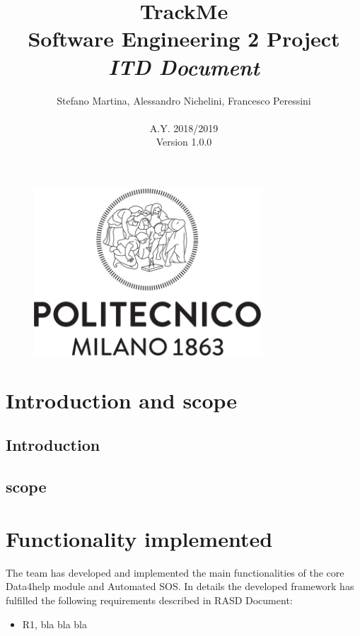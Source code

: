 \documentclass{article}
\begin{document}
\begin{figure}[t]
\centering
	\includegraphics[height=6.25cm,keepaspectratio]{Figures/logo}
\end{figure}

\title{TrackMe \\ Software Engineering 2 Project\\ \textit{ITD Document} }
\author{Stefano Martina, Alessandro Nichelini, Francesco Peressini
		\\ \\ A.Y. 2018/2019 \\ Version 1.0.0}
		
\maketitle
\newpage

\tableofcontents
\newpage

\section{Introduction and scope}
\subsection{Introduction}
\subsection{scope}

\section{Functionality implemented}
The team has developed and implemented the main functionalities of the core Data4help module and Automated SOS.
In details the developed framework has fulfilled the following requirements described in RASD Document:
\begin{itemize}
	\item R1, bla bla bla 
\end{itemize}
\end{document}
